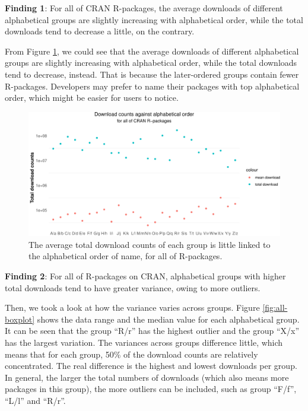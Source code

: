 \documentclass[
]{book}
\newenvironment{discovery}[1]{%
  \begin{tcolorbox}[colback=blue!30,colframe=blue!80!black]#1}{\end{tcolorbox}}
\begin{document}
\begin{discovery}
\textbf{Finding 1}: For all of CRAN R-packages, the average downloads of
different alphabetical groups are slightly increasing with alphabetical
order, while the total downloads tend to decrease a little, on the
contrary.
\end{discovery}

From Figure \ref{fig:ahlpha-downloads}, we could see that the average downloads of different alphabetical groups are slightly increasing with alphabetical order, while the total downloads tend to decrease, instead. That is because the later-ordered groups contain fewer R-packages. Developers may prefer to name their packages with top alphabetical order, which might be easier for users to notice.



\begin{figure}

{\centering \includegraphics{figures/ahlpha-downloads-1} 

}

\caption{The average total download counts of each group is little linked to the alphabetical order of name, for all of R-packages.}\label{fig:ahlpha-downloads}
\end{figure}

\begin{discovery}
\textbf{Finding 2}: For all of R-packages on CRAN, alphabetical groups
with higher total downloads tend to have greater variance, owing to more
outliers.
\end{discovery}

Then, we took a look at how the variance varies across groups. Figure \ref{fig:all-boxplot} shows the data range and the median value for each alphabetical group. It can be seen that the group ``R/r'' has the highest outlier and the group ``X/x'' has the largest variation. The variances across groups difference little, which means that for each group, 50\% of the download counts are relatively concentrated. The real difference is the highest and lowest downloads per group. In general, the larger the total numbers of downloads (which also means more packages in this group), the more outliers can be included, such as group ``F/f'', ``L/l'' and ``R/r''.
\end{document}
